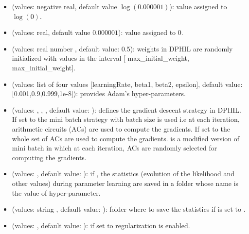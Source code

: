 \documentclass[letterpaper,10pt,english]{sphinxmanual}
\begin{document}
\begin{itemize}
\begin{itemize}
\item {} 
 (values: negative real, default value \(\log(0.000001)\)): value assigned to \(\log(0)\).

\item {} 
 (values: real, default value \(0.000001\)): value assigned to \(0\).

\item {} 
 (values: real number , default value: 0.5): weights in DPHIL are randomly initialized with values in the interval {[}-max\_initial\_weight, max\_initial\_weight{]}.

\item {} 
 (values: list of four values {[}learningRate, beta1, beta2, epsilon{]}, default value: {[}0.001,0.9,0.999,1e-8{]}): provides Adam’s hyper-parameters.

\item {} 
 (values: , , , default value: ): defines the gradient descent strategy in DPHIL. If set to  the mini batch strategy with batch size  is used i.e at each iteration,  arithmetic circuits (ACs) are used to compute the gradients. If set to  the whole set of ACs are used to compute the gradients.  is a modified version of mini batch in which at each iteration,   ACs are randomly selected for computing the gradients.

\item {} 
 (values: , default value: ): if , the statistics (evolution of the likelihood and other values) during parameter learning are saved in a folder whose name is the value of  hyper-parameter.

\item {} 
 (values: string , default value: ): folder where to save the statistics if  is set to .

\item {} 
 (values:  , default value: ): if set to  regularization is enabled.


\end{itemize}
\end{itemize}
\end{document}
